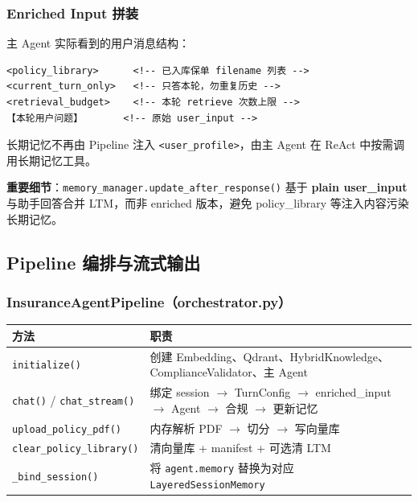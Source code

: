 \documentclass[11pt,a4paper]{ctexart}
\begin{document}
\subsubsection{Enriched Input 拼装}

主 Agent 实际看到的用户消息结构：

\begin{verbatim}
<policy_library>      <!-- 已入库保单 filename 列表 -->
<current_turn_only>   <!-- 只答本轮，勿重复历史 -->
<retrieval_budget>    <!-- 本轮 retrieve 次数上限 -->
【本轮用户问题】       <!-- 原始 user_input -->
\end{verbatim}

长期记忆不再由 Pipeline 注入 \texttt{<user\_profile>}，由主 Agent 在 ReAct 中按需调用长期记忆工具。

\textbf{重要细节}：\texttt{memory\_manager.update\_after\_response()} 基于 \textbf{plain user\_input} 与助手回答合并 LTM，而非 enriched 版本，避免 policy\_library 等注入内容污染长期记忆。

\subsection{Pipeline 编排与流式输出}

\subsubsection{InsuranceAgentPipeline（orchestrator.py）}

\begin{center}
\begin{tabular}{p{3.5cm}p{9cm}}
\toprule
\textbf{方法} & \textbf{职责} \\
\midrule
\texttt{initialize()} & 创建 Embedding、Qdrant、HybridKnowledge、ComplianceValidator、主 Agent \\
\texttt{chat()} / \texttt{chat\_stream()} & 绑定 session $\rightarrow$ TurnConfig $\rightarrow$ enriched\_input $\rightarrow$ Agent $\rightarrow$ 合规 $\rightarrow$ 更新记忆 \\
\texttt{upload\_policy\_pdf()} & 内存解析 PDF $\rightarrow$ 切分 $\rightarrow$ 写向量库 \\
\texttt{clear\_policy\_library()} & 清向量库 + manifest + 可选清 LTM \\
\texttt{\_bind\_session()} & 将 \texttt{agent.memory} 替换为对应 \texttt{LayeredSessionMemory} \\
\bottomrule
\end{tabular}
\end{center}
\end{document}
